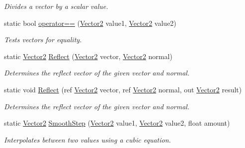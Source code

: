 \begin{DoxyCompactItemize}
\begin{DoxyCompactList}\small\item\em Divides a vector by a scalar value.\end{DoxyCompactList}\item 
static bool \hyperlink{structMicrosoft_1_1Xna_1_1Framework_1_1Vector2_a0da15b46bec69f71db8bc92c99d0d1d2}{operator==} (\hyperlink{structMicrosoft_1_1Xna_1_1Framework_1_1Vector2}{Vector2} value1, \hyperlink{structMicrosoft_1_1Xna_1_1Framework_1_1Vector2}{Vector2} value2)
\begin{DoxyCompactList}\small\item\em Tests vectors for equality.\end{DoxyCompactList}\item 
static \hyperlink{structMicrosoft_1_1Xna_1_1Framework_1_1Vector2}{Vector2} \hyperlink{structMicrosoft_1_1Xna_1_1Framework_1_1Vector2_aa20c80917910a62e6961e9fb3d122c2d}{Reflect} (\hyperlink{structMicrosoft_1_1Xna_1_1Framework_1_1Vector2}{Vector2} vector, \hyperlink{structMicrosoft_1_1Xna_1_1Framework_1_1Vector2}{Vector2} normal)
\begin{DoxyCompactList}\small\item\em Determines the reflect vector of the given vector and normal.\end{DoxyCompactList}\item 
static void \hyperlink{structMicrosoft_1_1Xna_1_1Framework_1_1Vector2_a2629e702f44c9fb85a2dc39d80700b39}{Reflect} (ref \hyperlink{structMicrosoft_1_1Xna_1_1Framework_1_1Vector2}{Vector2} vector, ref \hyperlink{structMicrosoft_1_1Xna_1_1Framework_1_1Vector2}{Vector2} normal, out \hyperlink{structMicrosoft_1_1Xna_1_1Framework_1_1Vector2}{Vector2} result)
\begin{DoxyCompactList}\small\item\em Determines the reflect vector of the given vector and normal.\end{DoxyCompactList}\item 
static \hyperlink{structMicrosoft_1_1Xna_1_1Framework_1_1Vector2}{Vector2} \hyperlink{structMicrosoft_1_1Xna_1_1Framework_1_1Vector2_a0f87f6e6bd2b64bc9a59e79f116d681a}{Smooth\+Step} (\hyperlink{structMicrosoft_1_1Xna_1_1Framework_1_1Vector2}{Vector2} value1, \hyperlink{structMicrosoft_1_1Xna_1_1Framework_1_1Vector2}{Vector2} value2, float amount)
\begin{DoxyCompactList}\small\item\em Interpolates between two values using a cubic equation.\end{DoxyCompactList}\item 

\end{DoxyCompactItemize}
